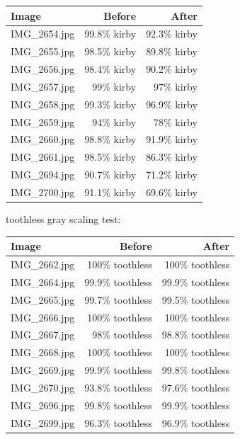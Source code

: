 \documentclass[11pt]{article}
\begin{document}
\begin{center}\footnotesize
\begin{tabular}{lrr}
\toprule
Image & Before & After \\
\midrule
IMG\_2654.jpg & 99.8\% kirby & 92.3\% kirby \\
IMG\_2655.jpg & 98.5\% kirby & 89.8\% kirby \\
IMG\_2656.jpg & 98.4\% kirby & 90.2\% kirby \\
IMG\_2657.jpg & 99\% kirby & 97\% kirby \\
IMG\_2658.jpg & 99.3\% kirby & 96.9\% kirby \\
IMG\_2659.jpg & 94\% kirby & 78\% kirby \\
IMG\_2660.jpg & 98.8\% kirby & 91.9\% kirby \\
IMG\_2661.jpg & 98.5\% kirby & 86.3\% kirby \\
IMG\_2694.jpg & 90.7\% kirby & 71.2\% kirby \\
IMG\_2700.jpg & 91.1\% kirby & 69.6\% kirby \\
\bottomrule
\end{tabular}
\end{center}

toothless gray scaling test:

\begin{center}\footnotesize
\begin{tabular}{lrr}
\toprule
Image & Before & After \\
\midrule
IMG\_2662.jpg & 100\% toothless & 100\% toothless \\
IMG\_2664.jpg & 99.9\% toothless & 99.9\% toothless \\
IMG\_2665.jpg & 99.7\% toothless & 99.5\% toothless \\
IMG\_2666.jpg & 100\% toothless & 100\% toothless \\
IMG\_2667.jpg & 98\% toothless & 98.8\% toothless \\
IMG\_2668.jpg & 100\% toothless & 100\% toothless \\
IMG\_2669.jpg & 99.9\% toothless & 99.8\% toothless \\
IMG\_2670.jpg & 93.8\% toothless & 97.6\% toothless \\
IMG\_2696.jpg & 99.8\% toothless & 99.9\% toothless \\
IMG\_2699.jpg & 96.3\% toothless & 96.9\% toothless \\
\bottomrule
\end{tabular}
\end{center}
\end{document}

